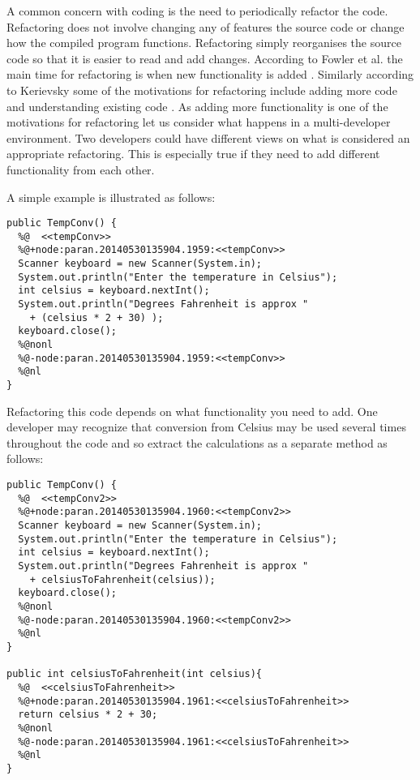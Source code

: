 A common concern with coding is the need to periodically refactor the code. Refactoring does not involve changing any of features the source code or change how the compiled program functions. Refactoring simply reorganises the source code so that it is easier to read and add changes. According to Fowler et al. the main time for refactoring is when new functionality is added \cite{Fowler1999}. Similarly according to Kerievsky some of the motivations for refactoring include adding more code and understanding existing code \cite{Kerievsky2004}. As adding more functionality is one of the motivations for refactoring let us consider what happens in a multi-developer environment. Two developers could have different views on what is considered an appropriate refactoring. This is especially true if they need to add different functionality from each other. 

A simple example is illustrated as follows:

\begin{lstlisting}
public TempConv() {
  %@  <<tempConv>>
  %@+node:paran.20140530135904.1959:<<tempConv>>
  Scanner keyboard = new Scanner(System.in);
  System.out.println("Enter the temperature in Celsius");
  int celsius = keyboard.nextInt();
  System.out.println("Degrees Fahrenheit is approx " 
    + (celsius * 2 + 30) );
  keyboard.close();
  %@nonl
  %@-node:paran.20140530135904.1959:<<tempConv>>
  %@nl
}
\end{lstlisting}

Refactoring this code depends on what functionality you need to add. One developer may recognize that conversion from Celsius may be used several times throughout the code and so extract the calculations as a separate method as follows:

\begin{lstlisting}
public TempConv() {
  %@  <<tempConv2>>
  %@+node:paran.20140530135904.1960:<<tempConv2>>
  Scanner keyboard = new Scanner(System.in);
  System.out.println("Enter the temperature in Celsius");
  int celsius = keyboard.nextInt();
  System.out.println("Degrees Fahrenheit is approx " 
    + celsiusToFahrenheit(celsius));
  keyboard.close();
  %@nonl
  %@-node:paran.20140530135904.1960:<<tempConv2>>
  %@nl
}

public int celsiusToFahrenheit(int celsius){
  %@  <<celsiusToFahrenheit>>
  %@+node:paran.20140530135904.1961:<<celsiusToFahrenheit>>
  return celsius * 2 + 30;
  %@nonl
  %@-node:paran.20140530135904.1961:<<celsiusToFahrenheit>>
  %@nl
}
\end{lstlisting}

